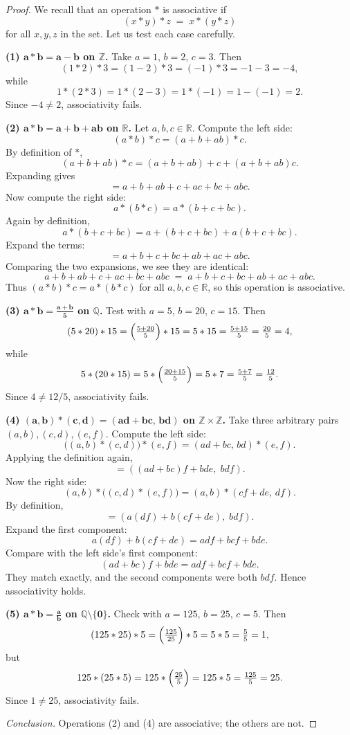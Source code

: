 \documentclass[12pt]{article}
\theoremstyle{definition}
\begin{document}
\begin{proof}
We recall that an operation $*$ is associative if
\[
(x*y)*z \;=\; x*(y*z)
\]
for all $x,y,z$ in the set. Let us test each case carefully.

\dotfill

\noindent\textbf{(1) $\boldsymbol{a*b=a-b}$ on $\boldsymbol{\mathbb{Z}}$.}
Take $a=1$, $b=2$, $c=3$. Then
\[
(1*2)*3=(1-2)*3=(-1)*3=-1-3=-4,
\]
while
\[
1*(2*3)=1*(2-3)=1*(-1)=1-(-1)=2.
\]
Since $-4\neq 2$, associativity fails.

\dotfill

\noindent\textbf{(2) $\boldsymbol{a*b=a+b+ab}$ on $\boldsymbol{\mathbb{R}}$.}
Let $a,b,c\in\mathbb{R}$. Compute the left side:
\[
(a*b)*c=(a+b+ab)*c.
\]
By definition of $*$,
\[
(a+b+ab)*c = (a+b+ab)+c+(a+b+ab)c.
\]
Expanding gives
\[
= a+b+ab+c+ac+bc+abc.
\]
Now compute the right side:
\[
a*(b*c)=a*(b+c+bc).
\]
Again by definition,
\[
a*(b+c+bc)=a+(b+c+bc)+a(b+c+bc).
\]
Expand the terms:
\[
= a+b+c+bc+ab+ac+abc.
\]
Comparing the two expansions, we see they are identical:
\[
a+b+ab+c+ac+bc+abc \;=\; a+b+c+bc+ab+ac+abc.
\]
Thus $(a*b)*c=a*(b*c)$ for all $a,b,c\in\mathbb{R}$, so this operation is associative.

\dotfill

\noindent\textbf{(3) $\boldsymbol{a*b=\tfrac{a+b}{5}}$ on $\boldsymbol{\mathbb{Q}}$.}
Test with $a=5$, $b=20$, $c=15$. Then
\[
(5*20)*15=\Bigl(\tfrac{5+20}{5}\Bigr)*15=5*15=\tfrac{5+15}{5}=\tfrac{20}{5}=4,
\]
while
\[
5*(20*15)=5*\Bigl(\tfrac{20+15}{5}\Bigr)=5*7=\tfrac{5+7}{5}=\tfrac{12}{5}.
\]
Since $4\neq 12/5$, associativity fails.

\dotfill

\noindent\textbf{(4) $\boldsymbol{(a,b)*(c,d)=(ad+bc,\,bd)}$ on $\boldsymbol{\mathbb{Z}\times\mathbb{Z}}$.}
Take three arbitrary pairs $(a,b),(c,d),(e,f)$. Compute the left side:
\[
\big((a,b)*(c,d)\big)*(e,f)=(ad+bc,\,bd)*(e,f).
\]
Applying the definition again,
\[
= ((ad+bc)f+bde,\;bdf).
\]
Now the right side:
\[
(a,b)*\big((c,d)*(e,f)\big)=(a,b)*(cf+de,\,df).
\]
By definition,
\[
= (a(df)+b(cf+de),\;bdf).
\]
Expand the first component:
\[
a(df)+b(cf+de)=adf+bcf+bde.
\]
Compare with the left side’s first component:
\[
(ad+bc)f+bde=adf+bcf+bde.
\]
They match exactly, and the second components were both $bdf$. Hence associativity holds.

\dotfill

\noindent\textbf{(5) $\boldsymbol{a*b=\tfrac{a}{b}}$ on $\boldsymbol{\mathbb{Q}\setminus\{0\}}$.}
Check with $a=125$, $b=25$, $c=5$. Then
\[
(125*25)*5=\Bigl(\tfrac{125}{25}\Bigr)*5=5*5=\tfrac{5}{5}=1,
\]
but
\[
125*(25*5)=125*\Bigl(\tfrac{25}{5}\Bigr)=125*5=\tfrac{125}{5}=25.
\]
Since $1\neq 25$, associativity fails.

\dotfill

\noindent\emph{Conclusion.} Operations (2) and (4) are associative; the others are not.

\dotfill

\end{proof}
\end{document}
